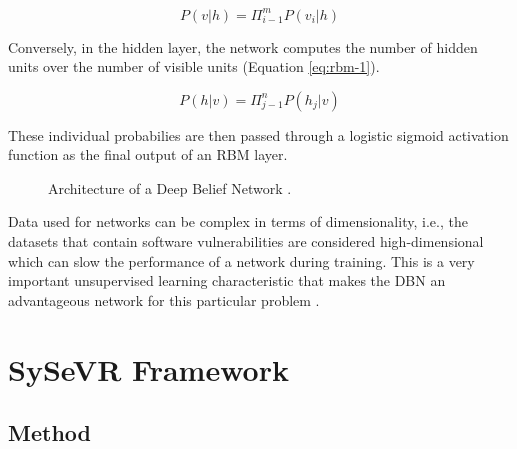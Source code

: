 \documentclass[12pt,twocolumn,letterpaper]{article}
\begin{document}
\begin{equation}
\label{eq:rbm-0}
    P(v|h)=\Pi_{i-1}^{m}P(v_{i}|h)
\end{equation}

Conversely, in the hidden layer, the network computes the number of hidden units over the number of 
visible units (Equation \ref{eq:rbm-1}).

\begin{equation}
\label{eq:rbm-1}
    P(h|v)=\Pi_{j-1}^{n}P(h_{j}|v)
\end{equation}

These individual probabilies are then passed through a logistic sigmoid activation function as the final 
output of an RBM layer.

\begin{figure}[h]
    \centering

    \caption{Architecture of a Deep Belief Network \cite{Lin20}.}
    \label{fig:dl-4}
\end{figure}

Data used for networks can be complex in terms of dimensionality, i.e., the datasets that contain software 
vulnerabilities are considered high-dimensional which can slow the performance of a network during training. 
This is a very important unsupervised learning characteristic that makes the DBN an advantageous network 
for this particular problem \cite{Lin20}.

\section{SySeVR Framework}
\label{sec:sysevr-framework}

\cite{Li22}

\subsection{Method}
\label{sub:method}
\end{document}
